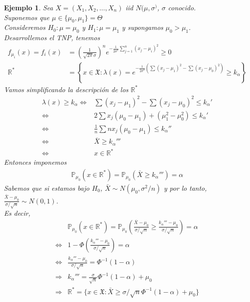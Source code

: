 \documentclass[10pt]{article}
\theoremstyle{plain}
\newtheorem{ej}{Ejemplo}
\theoremstyle{definition}
\begin{document}
\begin{ej}
Sea $X=(X_{1},X_{2},\ldots,X_{n})$ iid $N(\mu,\sigma^)$, $\sigma$ conocido.\\
Suponemos que $\mu \in \{\mu_{0},\mu_{1}\}= \Theta$ \\
Consideremos $H_{0}: \mu = \mu_{0}$ y $H_{1}: \mu = \mu_{1}$ y supongamos $\mu_{0}> \mu_{1}$.\\

Desarrollemos el TNP, tenemos
\begin{align*}
f_{\mu_{i}}(x) = f_{i}(x) &= \left(\frac{1}{\sqrt{2\pi}\sigma}\right)^n e^{-\frac{1}{2\sigma^2}\sum_{j=1}^n{(x_{j}-\mu_{i})^2}}\ge 0\\
\mathbb{R}^* &= \left\lbrace x \in\mathfrak{X}\colon \lambda(x) = e^{-\frac{1}{2\sigma^2}\left(\sum{(x_{j}-\mu_{1})^2}-\sum{(x_{j}-\mu_{0})^2}\right)} \ge k_{\alpha}\right\rbrace
\end{align*}
Vamos simplificando la descripción de los $\mathbb{R}^*$
\begin{align*}
\lambda(x) \ge k_{\alpha} \Leftrightarrow &\sum{(x_{j}-\mu_{1})^2}-\sum{(x_{j}-\mu_{0})^2} \le k_{\alpha}'\\
\Leftrightarrow & 2\sum{x_{j}(\mu_{0}-\mu_{1})} + (\mu_{1}^2-\mu_{0}^2) \le k_{\alpha}'\\
\Leftrightarrow & \frac{1}{n} \sum {nx_{j}(\mu_{0}-\mu_{1})} \le k_{\alpha}''\\
\Leftrightarrow & \bar{X} \ge k_{\alpha}'''\\
\Leftrightarrow & x \in \mathbb{R}^*
\end{align*}
Entonces imponemos
\begin{align*}
\mathbb{P}_{\mu_{0}}(x \in \mathbb{R}^*) = \mathbb{P}_{\mu_{0}}(\bar{X} \ge k_{\alpha}''') = \alpha
\end{align*}
Sabemos que si estamos bajo $H_{0}$, $\bar{X}\sim N(\mu_{0},\sigma^2/n)$ y por lo tanto, $\frac{\bar{X}-\mu_{0}}{\sigma/\sqrt{n}} \sim N(0,1)$.\\

Es decir,
\begin{align*}
&\mathbb{P}_{\mu_{0}}(x \in \mathbb{R}^*) = \mathbb{P}_{\mu_{0}}\left(\frac{\bar{X}-\mu_{0}}{\sigma/\sqrt{n}} \ge \frac{k_{\alpha}'''-\mu_{0}}{\sigma/\sqrt{n}}\right) = \alpha \\
\Leftrightarrow & 1-\Phi\left(\frac{k_{\alpha}'''-\mu_{0}}{\sigma/\sqrt{n}}\right) = \alpha\\
\Leftrightarrow & \frac{k_{\alpha}'''-\mu_{0}}{\sigma/\sqrt{n}} = \Phi^{-1}(1-\alpha)\\
\Rightarrow & k_{\alpha}''' = \frac{\sigma}{\sqrt{n}} \Phi^{-1}(1-\alpha) + \mu_{0}\\
\Rightarrow & \mathbb{R}^* = \{x\in\mathfrak{X}\colon \bar{X}\ge\sigma/\sqrt{n} \Phi^{-1}(1-\alpha) + \mu_{0}\}
\end{align*}
\end{ej}
\end{document}
